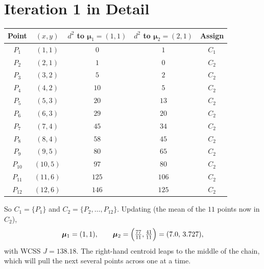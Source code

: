 \documentclass[11pt,a4paper]{report}
\theoremstyle{definition}
\theoremstyle{plain}
\theoremstyle{remark}
\newcommand{\vmu}{\bm{\mu}}
\begin{document}
	\section{Iteration 1 in Detail}
	\begin{center}
	\begin{tabular}{@{}ccccc@{}}
	\toprule
	Point & $(x,y)$ & $d^2$ to $\vmu_1{=}(1,1)$ & $d^2$ to $\vmu_2{=}(2,1)$ & Assign\\
	\midrule
	$P_1$ & $(1,1)$ & $0$ & $1$ & $C_1$\\
	$P_2$ & $(2,1)$ & $1$ & $0$ & $C_2$\\
	$P_3$ & $(3,2)$ & $5$ & $2$ & $C_2$\\
	$P_4$ & $(4,2)$ & $10$ & $5$ & $C_2$\\
	$P_5$ & $(5,3)$ & $20$ & $13$ & $C_2$\\
	$P_6$ & $(6,3)$ & $29$ & $20$ & $C_2$\\
	$P_7$ & $(7,4)$ & $45$ & $34$ & $C_2$\\
	$P_8$ & $(8,4)$ & $58$ & $45$ & $C_2$\\
	$P_9$ & $(9,5)$ & $80$ & $65$ & $C_2$\\
	$P_{10}$ & $(10,5)$ & $97$ & $80$ & $C_2$\\
	$P_{11}$ & $(11,6)$ & $125$ & $106$ & $C_2$\\
	$P_{12}$ & $(12,6)$ & $146$ & $125$ & $C_2$\\
	\bottomrule
	\end{tabular}
	\end{center}
	So $C_1=\{P_1\}$ and $C_2=\{P_2,\dots,P_{12}\}$. Updating (the mean of the $11$
	points now in $C_2$),
	\[
	\vmu_1=(1,1),\qquad
	\vmu_2=\Bigl(\tfrac{77}{11},\tfrac{41}{11}\Bigr)=(7.0,\,3.727),
	\]
	with WCSS $J=138.18$. The right-hand centroid leaps to the middle of the chain,
	which will pull the next several points across one at a time.
	
\end{document}
